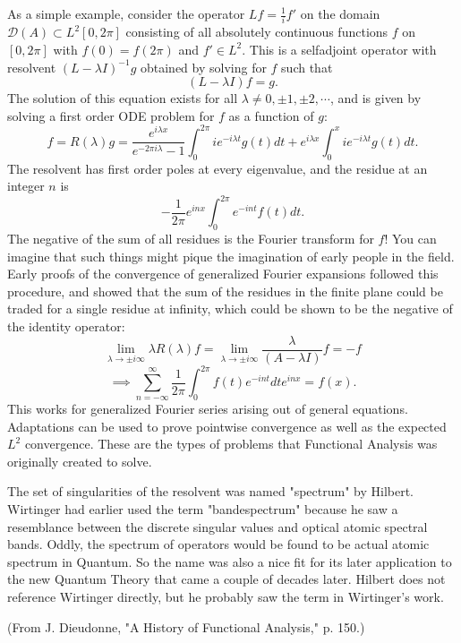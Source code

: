 \documentclass{article}
\begin{document}
As a simple example, consider the operator $Lf=\frac{1}{i}f'$ on the domain $\mathcal{D}(A)\subset L^2[0,2\pi]$ consisting of all absolutely continuous functions $f$ on $[0,2\pi]$ with $f(0)=f(2\pi)$ and $f'\in L^2$. This is a selfadjoint operator with resolvent $(L-\lambda I)^{-1}g$ obtained by solving for $f$ such that
\begin{equation}
        (L-\lambda I)f = g.
\end{equation}
The solution of this equation exists for all $\lambda\ne 0,\pm 1,\pm 2,\cdots$, and is given by solving a first order ODE problem for $f$ as a function of $g$:
\begin{equation}
     f=R(\lambda)g= \frac{e^{i\lambda x}}{e^{-2\pi i\lambda}-1}\int_{0}^{2\pi}ie^{-i\lambda t}g(t)dt+e^{i\lambda x}\int_{0}^{x}ie^{-i\lambda t}g(t)dt.
\end{equation}
The resolvent has first order poles at every eigenvalue, and the residue at an integer $n$ is
\begin{equation}
           -\frac{1}{2\pi}e^{inx}\int_{0}^{2\pi}e^{-int}f(t)dt.
\end{equation}
The negative of the sum of all residues is the Fourier transform for $f$! You can imagine that such things might pique the imagination of early people in the field. Early proofs of the convergence of generalized Fourier expansions followed this procedure, and showed that the sum of the residues in the finite plane could be traded for a single residue at infinity, which could be shown to be the negative of the identity operator:
\begin{equation}
         \lim_{\lambda\rightarrow \pm i\infty}\lambda R(\lambda)f = 
     \lim_{\lambda\rightarrow\pm i\infty}\frac{\lambda}{(A-\lambda I)}f = -f
\end{equation}
\begin{equation}
       \implies  \sum_{n=-\infty}^{\infty}\frac{1}{2\pi}\int_{0}^{2\pi}f(t)e^{-int}dt e^{inx} = f(x).
\end{equation}
This works for generalized Fourier series arising out of general equations. Adaptations can be used to prove pointwise convergence as well as the expected $L^2$ convergence. These are the types of problems that Functional Analysis was originally created to solve.

The set of singularities of the resolvent was named "spectrum" by Hilbert. Wirtinger had earlier used the term "bandespectrum" because he saw a resemblance between the discrete singular values and optical atomic spectral bands. Oddly, the spectrum of operators would be found to be actual atomic spectrum in Quantum. So the name was also a nice fit for its later application to the new Quantum Theory that came a couple of decades later. Hilbert does not reference Wirtinger directly, but he probably saw the term in Wirtinger's work.

\vspace{1em}
\noindent
(From J. Dieudonne, "A History of Functional Analysis," p. 150.)
\end{document}
